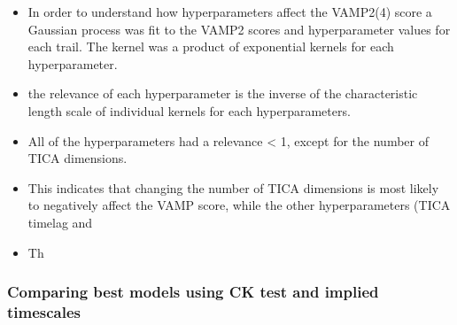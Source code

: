 \documentclass[journal=jacsat,manuscript=article]{achemso}
\begin{document}
\begin{itemize}
    \item In order to understand how hyperparameters affect the VAMP2(4) score a Gaussian process was fit to the VAMP2 scores and hyperparameter values for each trail. The kernel was a product of exponential kernels for each hyperparameter.  
    \item the relevance of each hyperparameter is the inverse of the characteristic length scale of individual kernels for each hyperparameters. 
    \item All of the hyperparameters had a relevance < 1, except for the number of TICA dimensions. 
    \item This indicates that changing the number of TICA dimensions is most likely to negatively affect the VAMP score, while the other hyperparameters (TICA timelag and 
    \item Th
\end{itemize}


\subsubsection{Comparing best models using CK test and implied timescales}
\end{document}

